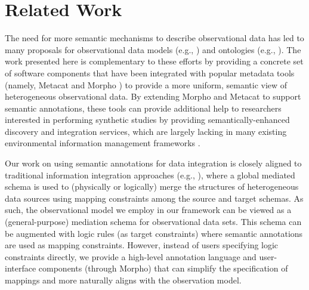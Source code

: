 
\section{Related Work}
\label{sec:related}

The need for more semantic mechanisms to describe observational data
has led to many proposals for observational data models (e.g.,
\cite{om,
  tarboton07:_cuahs_commun_obser_data_model,netcdf,cushing07:_compon_based_end_user_datab})
and ontologies (e.g.,
\cite{fox09:_ontol,sweet,sheth08:_seman_sensor_web,mungall110:_integ}).
The work presented here is complementary to these efforts by providing
a concrete set of software components that have been integrated with
popular metadata tools (namely, Metacat
\cite{metacat02:_manag_heter_ecolog_data_using_morph} and Morpho
\cite{berkley01:_metac}) to provide a more uniform, semantic view of
heterogeneous observational data. By extending Morpho and Metacat to
support semantic annotations, these tools can provide additional help
to researchers interested in performing synthetic studies by providing
semantically-enhanced discovery and integration services, which are
largely lacking in many existing environmental information management
frameworks \cite{jones_new_2006}.

Our work on using semantic annotations for data integration is closely
aligned to traditional information integration approaches (e.g.,
\cite{HalevyDataIntegration06,kolaitis05}), where a global mediated
schema is used to (physically or logically) merge the structures of
heterogeneous data sources using mapping constraints among the source
and target schemas. As such, the observational model we employ in our
framework can be viewed as a (general-purpose) mediation schema for
observational data sets.  This schema can be augmented with logic
rules (as target constraints) where semantic annotations are used as
mapping constraints. However, instead of users specifying logic
constraints directly, we provide a high-level annotation language and
user-interface components (through Morpho) that can simplify the
specification of mappings and more naturally aligns with the
observation model.

